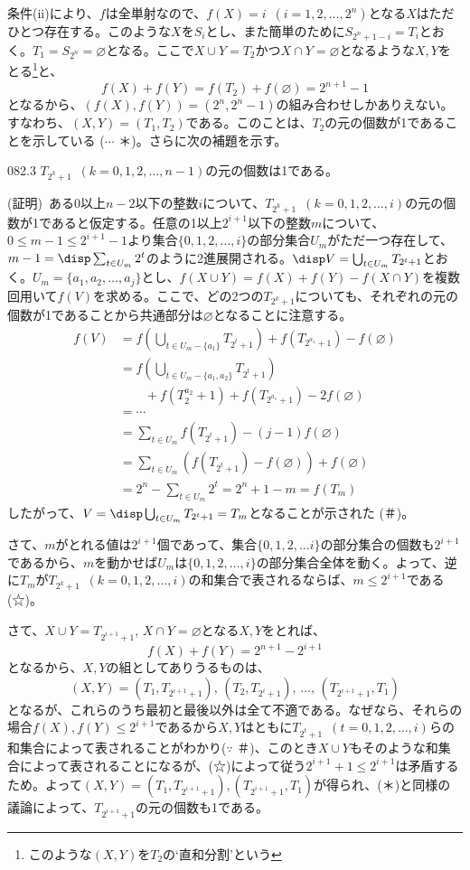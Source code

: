 条件(ii)により、$f$は全単射なので、$f(X)=i$~$(i=1,2,\dots,2^n)$となる$X$はただひとつ存在する。このような$X$を$S_i$とし、また簡単のために$S_{2^n+1-i}=T_i$とおく。$T_1=S_{2^n}=\varnothing$となる。ここで$X\cup Y=T_2$かつ$X\cap Y=\varnothing$となるような$X, Y$をとる\footnote{このような$(X, Y)$を$T_2$の`直和分割'という}と、
\[ f(X)+f(Y)=f(T_2)+f(\varnothing)=2^{n+1}-1 \]
となるから、$\left(f(X), f(Y)\right)=(2^n, 2^n-1)$の組み合わせしかありえない。すなわち、$(X, Y)=(T_1, T_2)$である。このことは、$T_2$の元の個数が1であることを示している ($\cdots$ ＊)。さらに次の補題を示す。
\begin{subthm}{082.3}
 $T_{2^k+1}$~$(k=0, 1, 2,\dots, n-1)$の元の個数は1である。
\end{subthm}
(証明)~ある0以上$n-2$以下の整数$i$について、$T_{2^k+1}$~$(k=0,1,2,\dots,i)$の元の個数が1であると仮定する。任意の1以上$2^{i+1}$以下の整数$m$について、$0\le m-1\le 2^{i+1}-1$より集合$\{0, 1, 2,\dots,i\}$の部分集合$U_m$がただ一つ存在して、$m-1=\disp \sum_{t\in U_m} 2^t$のように2進展開される。$\disp V=\bigcup_{t\in U_m} T_{2^t+1}$とおく。$U_m=\{a_1, a_2,\dots, a_j\}$とし、$f(X\cup Y)=f(X)+f(Y)-f(X\cap Y)$を複数回用いて$f(V)$を求める。ここで、どの2つの$T_{2^k+1}$についても、それぞれの元の個数が1であることから共通部分は$\varnothing$となることに注意する。
\begin{align*}
 f(V)&=f\left( \bigcup_{t\in U_m-\{a_1\}} T_{2^t+1}\right)+f\left(T_{2^{a_1}+1}\right)-f(\varnothing) \\
 &=f\left(\bigcup_{t\in U_m-\{a_1, a_2\}} T_{2^t+1}\right) \\
 & \qquad +f\left(T_2^{a_2}+1\right)+f\left(T_{2^{a_1}+1}\right)-2f(\varnothing) \\
 &= \cdots \\
 &=\sum_{t\in U_m} f(T_{2^t+1}) -(j-1)f(\varnothing) \\
 &= \sum_{t\in U_m}\left(f(T_{2^t+1})-f(\varnothing)\right) + f(\varnothing) \\
 &= 2^n-\sum_{t\in U_m} 2^t = 2^n+1-m = f(T_m)
\end{align*}
したがって、$V=\disp \bigcup_{t\in U_m} T_{2^t+1}=T_m$となることが示された (＃)。

さて、$m$がとれる値は$2^{i+1}$個であって、集合$\{0, 1, 2,\dots i\}$の部分集合の個数も$2^{i+1}$であるから、$m$を動かせば$U_m$は$\{0, 1, 2,\dots, i\}$の部分集合全体を動く。よって、逆に$T_m$が$T_{2^k+1}$~$(k=0, 1, 2,\dots, i)$の和集合で表されるならば、$m\le 2^{i+1}$である (☆)。

さて、$X\cup Y=T_{2^{i+1}+1}$, $X\cap Y=\varnothing$となる$X, Y$をとれば、
\[ f(X)+f(Y)=2^{n+1}-2^{i+1} \]
となるから、$X, Y$の組としてありうるものは、
\[ (X, Y)=(T_1, T_{2^{i+1}+1}),\, (T_2, T_{2^i+1}),\, \dots,\, (T_{2^{i+1}+1}, T_1) \]
となるが、これらのうち最初と最後以外は全て不適である。なぜなら、それらの場合$f(X), f(Y)\le 2^{i+1}$であるから$X, Y$はともに$T_{2^t+1}$~$(t=0, 1, 2, \dots, i)$らの和集合によって表されることがわかり($\because$ ＃)、このとき$X\cup Y$もそのような和集合によって表されることになるが、(☆)によって従う$2^{i+1}+1\le 2^{i+1}$は矛盾するため。よって$(X,Y)=(T_1, T_{2^{i+1}+1}), (T_{2^{i+1}+1}, T_1)$が得られ、(＊)と同様の議論によって、$T_{2^{i+1}+1}$の元の個数も1である。

